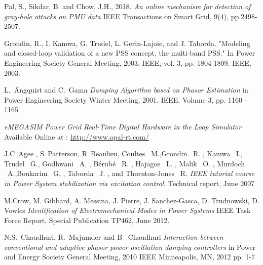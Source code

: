 \documentclass[journal]{IEEEtran}
\begin{document}
\begin{thebibliography}{1}
 Pal, S., Sikdar, B. and Chow, J.H., 2018. \emph{An online mechanism for detection of gray-hole attacks on PMU data} IEEE Transactions on Smart Grid, 9(4), pp.2498-2507.

 Grondin, R., I. Kamwa, G. Trudel, L. Gerin-Lajoie, and J. Taborda. "Modeling and closed-loop validation of a new PSS concept, the multi-band PSS." In Power Engineering Society General Meeting, 2003, IEEE, vol. 3, pp. 1804-1809. IEEE, 2003.



L.~\"{A}ngquist and C.~Gama  \emph{Damping Algorithm based on Phasor Estimation} in Power Engineering Society Winter Meeting, 2001. IEEE, Volume 3, pp. 1160 - 1165  

 \emph{eMEGASIM Power Grid Real-Time Digital Hardware in the Loop Simulator} Available Online at : \url{http://www.opal-rt.com/}

  


 J.C~Agee , S~Patterson, R~Beaulieu, Coultes \ M.,Grondin \ R. , Kamwa \ I.,
Trudel \ G., Godhwani \ A. , Bérubé \ R. , Hajagos \ L. , Malik \ O. , Murdoch \ A.,Boukarim \ G. , Taborda \ J. , and Thornton-Jones \ R. \emph{IEEE tutorial course in Power System stabilization via excitation control.} Technical report, June 2007


 M.Crow, M. Gibbard, A. Messina, J. Pierre, J. Sanchez-Gasca, D. Trudnowski, D. Vowles \emph{Identification of Electromechanical Modes in Power Systems} IEEE Task Force Report, Special Publication TP462, June 2012.

 N.S.~Chaudhuri, R.~Majumder and B~ Chaudhuri \emph{Interaction between conventional and adaptive phasor power oscillation damping controllers} in Power and Energy Society General Meeting, 2010 IEEE Minneapolis, MN, 2012 pp. 1-7
  

\end{thebibliography}
\end{document}
